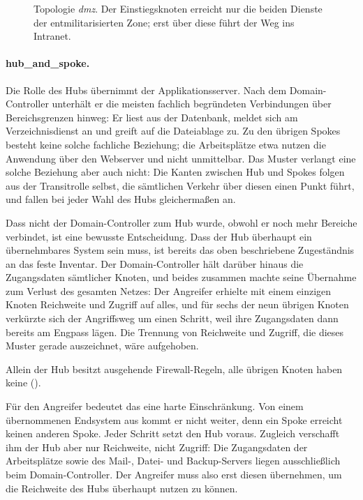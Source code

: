 \begin{figure}[H]
  \centering
  
  \caption[Topologie \emph{dmz}]{Topologie \emph{dmz}. Der Einstiegsknoten
  erreicht nur die beiden Dienste der entmilitarisierten Zone; erst über diese
  führt der Weg ins Intranet.}
  \label{fig:topo-dmz}
\end{figure}

\paragraph{hub\_and\_spoke.}
Die Rolle des Hubs übernimmt der Applikationsserver. Nach dem
Domain-Controller unterhält er die meisten fachlich begründeten Verbindungen
über Bereichsgrenzen hinweg: Er liest aus der Datenbank, meldet sich am
Verzeichnisdienst an und greift auf die Dateiablage zu. Zu den übrigen Spokes
besteht keine solche fachliche Beziehung; die Arbeitsplätze etwa nutzen die
Anwendung über den Webserver und nicht unmittelbar. Das Muster verlangt eine
solche Beziehung aber auch nicht: Die Kanten zwischen Hub und Spokes folgen aus
der Transitrolle selbst, die sämtlichen Verkehr über diesen einen Punkt führt,
und fallen bei jeder Wahl des Hubs gleichermaßen an.

Dass nicht der Domain-Controller zum Hub wurde, obwohl er noch mehr Bereiche
verbindet, ist eine bewusste Entscheidung. Dass der Hub überhaupt ein
übernehmbares System sein muss, ist bereits das oben beschriebene
Zugeständnis an das feste Inventar. Der Domain-Controller hält darüber hinaus
die Zugangsdaten sämtlicher Knoten, und beides zusammen machte seine Übernahme
zum Verlust des gesamten Netzes: Der Angreifer erhielte mit einem einzigen
Knoten Reichweite und Zugriff auf alles, und für sechs der neun übrigen Knoten
verkürzte sich der Angriffsweg um einen Schritt, weil ihre Zugangsdaten dann
bereits am Engpass lägen. Die Trennung von Reichweite und Zugriff, die dieses
Muster gerade auszeichnet, wäre aufgehoben.

Allein der Hub besitzt ausgehende Firewall-Regeln, alle übrigen Knoten haben
keine ().

Für den Angreifer bedeutet das eine harte Einschränkung. Von einem übernommenen
Endsystem aus kommt er nicht weiter, denn ein Spoke erreicht keinen anderen
Spoke. Jeder Schritt setzt den Hub voraus. Zugleich verschafft ihm der Hub aber
nur Reichweite, nicht Zugriff: Die Zugangsdaten der Arbeitsplätze sowie des
Mail-, Datei- und Backup-Servers liegen ausschließlich beim Domain-Controller.
Der Angreifer muss also erst diesen übernehmen, um die Reichweite des Hubs
überhaupt nutzen zu können.

